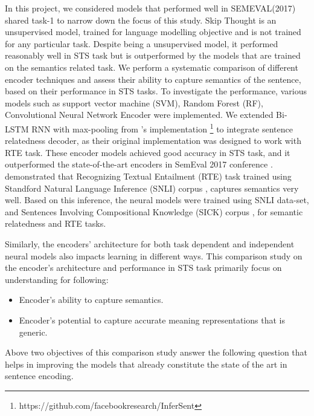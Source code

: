 \documentclass[12pt]{report} %
\begin{document}
 In this project, we considered models that performed well in SEMEVAL(2017) shared task-1  to narrow down the focus of this study. Skip Thought \citep{kiros2015skip} is an unsupervised model, trained for language modelling objective and is not trained for any particular task. Despite being a unsupervised model, it performed reasonably well in STS task but is outperformed by the models that are trained on the semantics related task.  We perform a systematic comparison of different encoder techniques and assess their ability to capture semantics of the sentence, based on their performance in STS tasks. To investigate the performance, various models such as support vector machine (SVM), Random Forest (RF), Convolutional Neural Network Encoder \citep{shao2017hcti} were implemented. We extended Bi-LSTM RNN with max-pooling from \cite{conneau2017supervised}'s implementation \footnote{https://github.com/facebookresearch/InferSent} to integrate sentence relatedness decoder, as their original implementation was designed to work with RTE task. These encoder models achieved good accuracy in STS task, and it outperformed the state-of-the-art encoders in SemEval 2017 conference \citep{cer2017semeval}. \cite{conneau2017supervised} demonstrated that Recognizing Textual Entailment (RTE) task trained using Standford Natural Language Inference (SNLI) corpus  \citep{bowman2015large}, captures semantics very well. Based on this inference, the neural models were trained using SNLI data-set, and Sentences Involving Compositional
 Knowledge (SICK) corpus \citep{marelli2014semeval}, for semantic relatedness and RTE tasks.
 
 		
 Similarly, the encoders' architecture for both task dependent and independent neural models also impacts learning in different ways. This comparison study on the encoder's architecture and performance in STS task primarily focus on understanding for following:

\begin{itemize}
	\item Encoder's ability to capture semantics.
	\item Encoder's potential to capture accurate meaning representations that is generic.
\end{itemize}	

Above two objectives of this comparison study answer the following question that helps in improving the models that already constitute the state of the art in sentence encoding.
\end{document}
